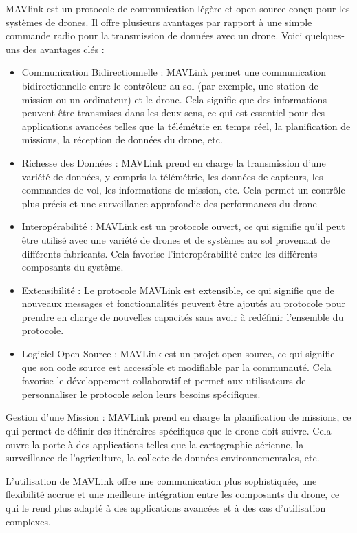 \documentclass[a4paper,12pt,french]{report}
\begin{document}
MAVlink est un protocole de communication légère et open source conçu pour les systèmes de drones. Il offre plusieurs avantages par rapport à une simple commande radio pour la transmission de données avec un drone. Voici quelques-uns des avantages clés :
\begin{itemize}
    \item Communication Bidirectionnelle : MAVLink permet une communication bidirectionnelle entre le contrôleur au sol (par exemple, une station de mission ou un ordinateur) et le drone. Cela signifie que des informations peuvent être transmises dans les deux sens, ce qui est essentiel pour des applications avancées telles que la télémétrie en temps réel, la planification de missions, la réception de données du drone, etc.
    \item Richesse des Données : MAVLink prend en charge la transmission d'une variété de données, y compris la télémétrie, les données de capteurs, les commandes de vol, les informations de mission, etc. Cela permet un contrôle plus précis et une surveillance approfondie des performances du drone
    \item Interopérabilité : MAVLink est un protocole ouvert, ce qui signifie qu'il peut être utilisé avec une variété de drones et de systèmes au sol provenant de différents fabricants. Cela favorise l'interopérabilité entre les différents composants du système.
    \item Extensibilité : Le protocole MAVLink est extensible, ce qui signifie que de nouveaux messages et fonctionnalités peuvent être ajoutés au protocole pour prendre en charge de nouvelles capacités sans avoir à redéfinir l'ensemble du protocole.
    \item Logiciel Open Source : MAVLink est un projet open source, ce qui signifie que son code source est accessible et modifiable par la communauté. Cela favorise le développement collaboratif et permet aux utilisateurs de personnaliser le protocole selon leurs besoins spécifiques.\newline
\end{itemize}

Gestion d'une Mission : MAVLink prend en charge la planification de missions, ce qui permet de définir des itinéraires spécifiques que le drone doit suivre. Cela ouvre la porte à des applications telles que la cartographie aérienne, la surveillance de l'agriculture, la collecte de données environnementales, etc.\newline

L'utilisation de MAVLink offre une communication plus sophistiquée, une flexibilité accrue et une meilleure intégration entre les composants du drone, ce qui le rend plus adapté à des applications avancées et à des cas d'utilisation complexes.
\end{document}
